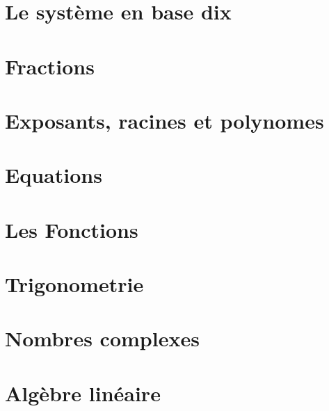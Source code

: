 \documentclass[a4paper]{article}
\begin{document}
    \section{Le système en base dix}

    \section{Fractions}

    \section{Exposants, racines et polynomes}

    \section{Equations}

    \section{Les Fonctions}

    \section{Trigonometrie}

    \section{Nombres complexes}

    \section{Algèbre linéaire}
\end{document}
